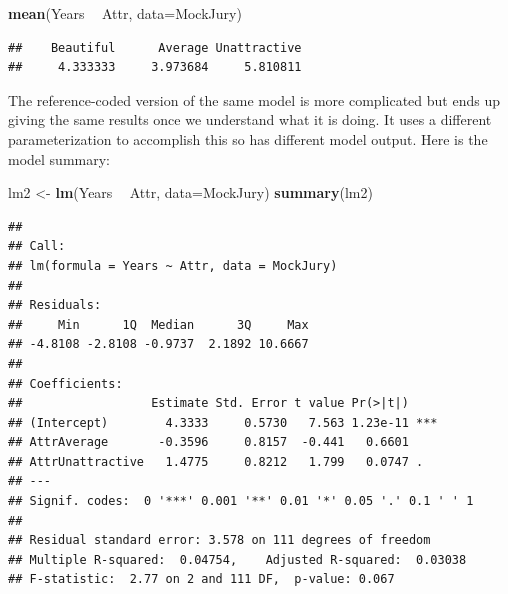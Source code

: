 \documentclass[]{book}
\newenvironment{Shaded}{\begin{snugshade}}{\end{snugshade}}
\newcommand{\KeywordTok}[1]{\textcolor[rgb]{0.13,0.29,0.53}{\textbf{#1}}}
\newcommand{\DataTypeTok}[1]{\textcolor[rgb]{0.13,0.29,0.53}{#1}}
\newcommand{\StringTok}[1]{\textcolor[rgb]{0.31,0.60,0.02}{#1}}
\newcommand{\OperatorTok}[1]{\textcolor[rgb]{0.81,0.36,0.00}{\textbf{#1}}}
\newcommand{\NormalTok}[1]{#1}
\begin{document}
\begin{Shaded}
\begin{Highlighting}[]
\KeywordTok{mean}\NormalTok{(Years }\OperatorTok{~}\StringTok{ }\NormalTok{Attr, }\DataTypeTok{data=}\NormalTok{MockJury)}
\end{Highlighting}
\end{Shaded}

\begin{verbatim}
##    Beautiful      Average Unattractive 
##     4.333333     3.973684     5.810811
\end{verbatim}

The reference-coded version of the same model is more complicated but
ends up giving the same results once we understand what it is doing. It
uses a different parameterization to accomplish this so has different
model output. Here is the model summary:

\begin{Shaded}
\begin{Highlighting}[]
\NormalTok{lm2 <-}\StringTok{ }\KeywordTok{lm}\NormalTok{(Years }\OperatorTok{~}\StringTok{ }\NormalTok{Attr, }\DataTypeTok{data=}\NormalTok{MockJury)}
\KeywordTok{summary}\NormalTok{(lm2)}
\end{Highlighting}
\end{Shaded}

\begin{verbatim}
## 
## Call:
## lm(formula = Years ~ Attr, data = MockJury)
## 
## Residuals:
##     Min      1Q  Median      3Q     Max 
## -4.8108 -2.8108 -0.9737  2.1892 10.6667 
## 
## Coefficients:
##                  Estimate Std. Error t value Pr(>|t|)    
## (Intercept)        4.3333     0.5730   7.563 1.23e-11 ***
## AttrAverage       -0.3596     0.8157  -0.441   0.6601    
## AttrUnattractive   1.4775     0.8212   1.799   0.0747 .  
## ---
## Signif. codes:  0 '***' 0.001 '**' 0.01 '*' 0.05 '.' 0.1 ' ' 1
## 
## Residual standard error: 3.578 on 111 degrees of freedom
## Multiple R-squared:  0.04754,    Adjusted R-squared:  0.03038 
## F-statistic:  2.77 on 2 and 111 DF,  p-value: 0.067
\end{verbatim}
\end{document}
